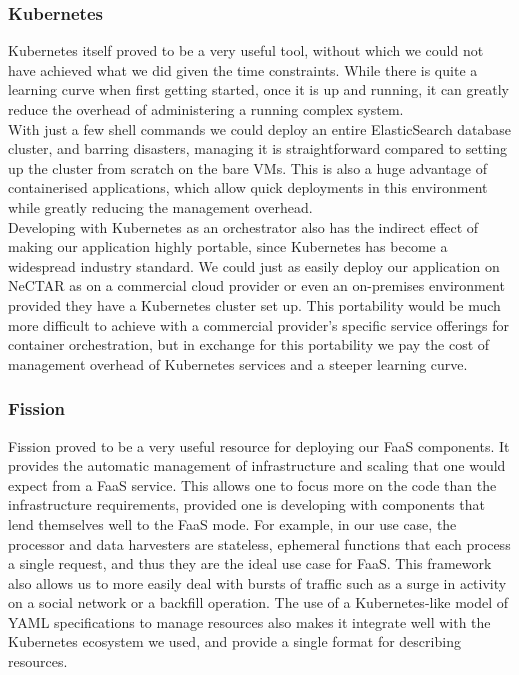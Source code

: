 \subsubsection{Kubernetes}
Kubernetes itself proved to be a very useful tool, without which we could not have achieved what we did given the time constraints. While there is quite a learning curve when first getting started, once it is up and running, it can greatly reduce the overhead of administering a running complex system.
\\

With just a few shell commands we could deploy an entire ElasticSearch database cluster, and barring disasters, managing it is straightforward compared to setting up the cluster from scratch on the bare VMs. This is also a huge advantage of containerised applications, which allow quick deployments in this environment while greatly reducing the management overhead.
\\

Developing with Kubernetes as an orchestrator also has the indirect effect of making our application highly portable, since Kubernetes has become a widespread industry standard. We could just as easily deploy our application on NeCTAR as on a commercial cloud provider or even an on-premises environment provided they have a Kubernetes cluster set up. This portability would be much more difficult to achieve with a commercial provider's specific service offerings for container orchestration, but in exchange for this portability we pay the cost of management overhead of Kubernetes services and a steeper learning curve.

\subsubsection{Fission}
Fission proved to be a very useful resource for deploying our FaaS components. It provides the automatic management of infrastructure and scaling that one would expect from a FaaS service. This allows one to focus more on the code than the infrastructure requirements, provided one is developing with components that lend themselves well to the FaaS mode. For example, in our use case, the processor and data harvesters are stateless, ephemeral functions that each process a single request, and thus they are the ideal use case for FaaS. This framework also allows us to more easily deal with bursts of traffic such as a surge in activity on a social network or a backfill operation. The use of a Kubernetes-like model of YAML specifications to manage resources also makes it integrate well with the Kubernetes ecosystem we used, and provide a single format for describing resources.
\\

